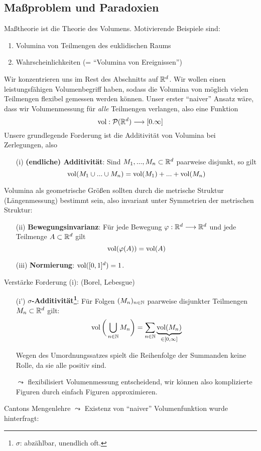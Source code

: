 \subsection{Maßproblem und Paradoxien}
Maßtheorie ist die Theorie des Volumens. Motivierende Beispiele sind:
\begin{enumerate}[label=\roman*),topsep=3pt, itemsep=0pt]
\item Volumina von Teilmengen des euklidischen Raums
\item Wahrscheinlichkeiten (= ``Volumina von Ereignissen'')
\end{enumerate}
Wir konzentrieren uns im Rest des Abschnitts auf $\mathbb{R}^d$. Wir wollen einen leistungsfähigen Volumenbegriff haben, sodass die Volumina von möglich vielen Teilmengen flexibel gemessen werden können. Unser erster ``naiver'' Ansatz wäre, dass wir Volumenmessung für \emph{alle} Teilmengen verlangen, also eine Funktion
\begin{equation*}
 \operatorname{vol}: \mathcal{P}(\mathbb{R}^d) \longrightarrow [0.\infty]
\end{equation*}
Unsere grundlegende Forderung ist die Additivität von Volumina bei Zerlegungen, also
\begin{enumerate}
\item[(i)] \textbf{(endliche) Additivität}: Sind $M_1,...,M_n\subset \mathbb{R}^d$ paarweise disjunkt, so gilt
\begin{equation*}
\operatorname{vol} (M_1\cup ... \cup M_n) = \operatorname{vol}(M_1)+...+\operatorname{vol} (M_n)
\end{equation*}
\end{enumerate}
Volumina als geometrische Größen sollten durch die metrische Struktur (Längenmessung) bestimmt sein, also invariant unter Symmetrien der metrischen Struktur:
\begin{enumerate}
\item[(ii)] \textbf{Bewegungsinvarianz}: Für jede Bewegung $\varphi: \mathbb{R}^d \longrightarrow \mathbb{R}^d$ und jede Teilmenge $A\subset \mathbb{R}^d$ gilt
\begin{equation*}
\operatorname{vol}(\varphi(A)) = \operatorname{vol} (A)
\end{equation*}
\item[(iii)] \textbf{Normierung}: $\operatorname{vol}([0,1]^d)=1$.
\end{enumerate}
Verstärke Forderung (i): (Borel, Lebesgue)
\begin{enumerate}
\item[(i')]\textbf{$\sigma$-Additivität\footnote{$\sigma$: abzählbar, unendlich oft.}}: Für Folgen $(M_n)_{n\in \mathbb{N}}$ paarweise disjunkter Teilmengen $M_n \subset \mathbb{R}^d$ gilt:
\begin{equation*}
\operatorname{vol}\bigg( \bigcup_{n\in \mathbb{N}} M_n \bigg) = \sum_{n\in \mathbb{N}} \underbrace{\operatorname{vol} (M_n)}_{\in [0,\infty]} 
\end{equation*}
\begin{remark}
Wegen des Umordnungssatzes spielt die Reihenfolge der Summanden keine Rolle, da sie alle positiv sind.
\end{remark}
$\leadsto$ flexibilisiert Volumenmessung entscheidend, wir können also komplizierte Figuren durch einfach Figuren approximieren.
\end{enumerate}
Cantons Mengenlehre $\leadsto$ Existenz von ``naiver'' Volumenfunktion wurde hinterfragt: %
